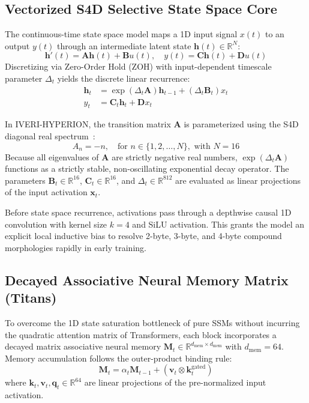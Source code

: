 \documentclass[10pt,twocolumn,letterpaper]{article}
\begin{document}
\subsection{Vectorized S4D Selective State Space Core}
The continuous-time state space model maps a 1D input signal $x(t)$ to an output $y(t)$ through an intermediate latent state $\mathbf{h}(t) \in \mathbb{R}^N$:
\begin{equation}
    \mathbf{h}'(t) = \mathbf{A}\mathbf{h}(t) + \mathbf{B}u(t), \quad y(t) = \mathbf{C}\mathbf{h}(t) + \mathbf{D}u(t)
\end{equation}
Discretizing via Zero-Order Hold (ZOH) with input-dependent timescale parameter $\Delta_t$ yields the discrete linear recurrence:
\begin{align}
    \mathbf{h}_t &= \exp(\Delta_t \mathbf{A})\mathbf{h}_{t-1} + (\Delta_t \mathbf{B}_t) x_t \\
    y_t &= \mathbf{C}_t \mathbf{h}_t + \mathbf{D} x_t
\end{align}

In IVERI-HYPERION, the transition matrix $\mathbf{A}$ is parameterized using the S4D diagonal real spectrum~\cite{gu2022s4d}:
\begin{equation}
    A_n = -n, \quad \text{for } n \in \{1, 2, \dots, N\}, \text{ with } N = 16
\end{equation}
Because all eigenvalues of $\mathbf{A}$ are strictly negative real numbers, $\exp(\Delta_t \mathbf{A})$ functions as a strictly stable, non-oscillating exponential decay operator. The parameters $\mathbf{B}_t \in \mathbb{R}^{16}$, $\mathbf{C}_t \in \mathbb{R}^{16}$, and $\Delta_t \in \mathbb{R}^{812}$ are evaluated as linear projections of the input activation $\mathbf{x}_t$.

Before state space recurrence, activations pass through a depthwise causal 1D convolution with kernel size $k = 4$ and SiLU activation. This grants the model an explicit local inductive bias to resolve 2-byte, 3-byte, and 4-byte compound morphologies rapidly in early training.

\subsection{Decayed Associative Neural Memory Matrix (Titans)}
To overcome the 1D state saturation bottleneck of pure SSMs without incurring the quadratic attention matrix of Transformers, each block incorporates a decayed matrix associative neural memory $\mathbf{M}_t \in \mathbb{R}^{d_{\text{mem}} \times d_{\text{mem}}}$ with $d_{\text{mem}} = 64$. Memory accumulation follows the outer-product binding rule:
\begin{equation}
    \mathbf{M}_t = \alpha_t \mathbf{M}_{t-1} + (\mathbf{v}_t \otimes \mathbf{k}_t^{\text{gated}})
\end{equation}
where $\mathbf{k}_t, \mathbf{v}_t, \mathbf{q}_t \in \mathbb{R}^{64}$ are linear projections of the pre-normalized input activation.
\end{document}
